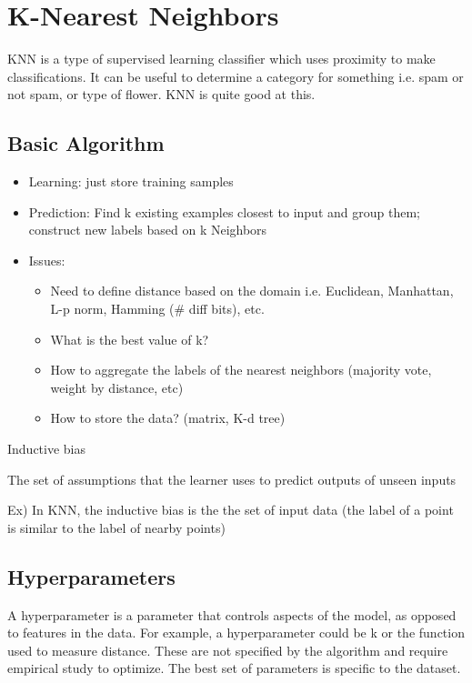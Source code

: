 \chapter{K-Nearest Neighbors}
 KNN is a type of supervised learning classifier which uses proximity to make classifications. It can be useful to determine a category for something i.e. spam or not spam, or type of flower. KNN is quite good at this.

 \section{Basic Algorithm}
\begin{itemize}
    \item Learning: just store training samples
    \item Prediction: Find k existing examples closest to input and group them; construct new labels based on k Neighbors
    \item Issues:
    \begin{itemize}
        \item Need to define distance based on the domain i.e. Euclidean, Manhattan, L-p norm, Hamming (\# diff bits), etc.
        \item What is the best value of k?
        \item How to aggregate the labels of the nearest neighbors (majority vote, weight by distance, etc)
        \item How to store the data? (matrix, K-d tree)
    \end{itemize}
\end{itemize}

\begin{definition}
    Inductive bias

    The set of assumptions that the learner uses to predict outputs of unseen inputs

    Ex) In KNN, the inductive bias is the the set of input data (the label of a point is similar to the label of nearby points)
\end{definition}

\section{Hyperparameters}
A hyperparameter is a parameter that controls aspects of the model, as opposed to features in the data. For example, a hyperparameter could be k or the function used to measure distance. These are not specified by the algorithm and require empirical study to optimize. The best set of parameters is specific to the dataset.

